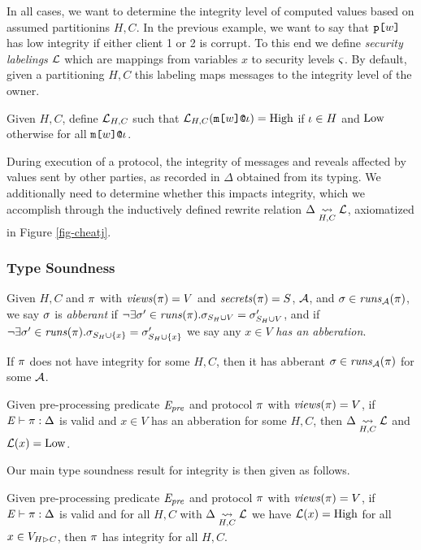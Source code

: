 In all cases, we want to determine the integrity level of computed
values based on assumed partitionins $H,C$. In the previous example,
we want to say that $\texttt{p[}w\texttt{]}$ has low integrity if either client 1 or
2 is corrupt.  To this end we define \emph{security labelings}
$\mathcal{L}$ which are mappings from variables $x$ to security levels
$\varsigma$. By default, given a partitioning $H,C$ this labeling maps
messages to the integrity level of the owner.
\begin{definition}  
  Given $H,C$,
  define $\mathcal{L}_{H,C}$ such that $\mathcal{L}_{H,C}(\texttt{m[}w\texttt{]}\texttt{@}\iota ) = \mathrm{High}$
  if $\iota \in H$  and $\mathrm{Low}$
  otherwise for all $\texttt{m[}w\texttt{]}\texttt{@}\iota$.
\end{definition}
During execution of a protocol, the integrity of messages and reveals
affected by values sent by other parties, as recorded in $\Delta$
obtained from its typing. We additionally need to determine
whether this impacts integrity, which we accomplish through
the inductively defined rewrite relation $\Delta \underset{H,C}{\leadsto} \mathcal{L}$,
axiomatized in Figure \ref{fig-cheatj}.

\subsubsection{Type Soundness}

\begin{definition}
  Given $H,C$ and $\pi$ with $\mathit{views}(\pi) = V$ and $\mathit{secrets}(\pi) = S$,
  $\mathcal{A}$, and $\sigma \in \mathit{runs}_{\mathcal{A}}(\pi)$, we say $\sigma$ is
  \emph{abberant} if $\neg\exists \sigma' \in \mathit{runs}(\pi) .
  \sigma_{S_H \cup V} = \sigma'_{S_H \cup V}$, and if
   $\neg\exists \sigma' \in \mathit{runs}(\pi) .
  \sigma_{S_H \cup \{ x \}} = \sigma'_{S_H \cup \{ x \}}$ we say
  any $x \in V$ \emph{has an abberation}.
\end{definition}

\begin{lemma}
  If $\pi$ does not have integrity for some $H,C$, then it has
  abberant $\sigma \in \mathit{runs}_{\mathcal{A}}(\pi)$ for some $\mathcal{A}$. 
\end{lemma}

\begin{lemma}
  Given pre-processing predicate $\mathit{E}_{\mathit{pre}}$ and protocol $\pi$ with
  $\mathit{views}(\pi) = V$, if 
  $\mathit{E} \vdash \pi : \Delta$ is valid
  and $x\in V$ has an abberation for some $H,C$,
  then $\Delta \underset{H,C}{\leadsto} \mathcal{L}$ and $\mathcal{L}(x) = \mathrm{Low}$.
\end{lemma}

Our main type soundness result for integrity is then given as follows.
\begin{theorem}
  Given pre-processing predicate $\mathit{E}_{\mathit{pre}}$ and protocol $\pi$ with
  $\mathit{views}(\pi) = V$, if
  $\mathit{E} \vdash \pi : \Delta$ is valid
  and for all $H,C$ with $\Delta \underset{H,C}{\leadsto} \mathcal{L}$ 
  we have $\mathcal{L}(x) = \mathrm{High}$ for all $x \in V_{H \rhd C}$, then $\pi$
  has integrity for all $H,C$.
\end{theorem}
